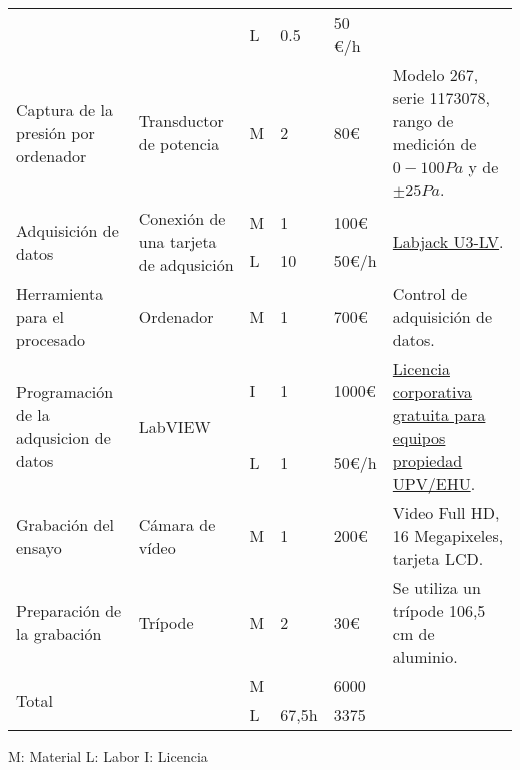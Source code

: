 \begin{landscape}
\begin{longtable}[]{p{4cm}p{4cm}lllp{8cm}}
 & & L & 0.5 & 50 \euro{}/h & \tabularnewline
Captura de la presión por ordenador & Transductor de potencia & M & 2 & 80\euro{} & Modelo 267, serie 1173078, rango de medición de \(0-100 Pa\) y de \(\pm 25 Pa\).\tabularnewline
\multirow{2}{4cm}{Adquisición de datos} & \multirow{2}{4cm}{Conexión de una tarjeta de adqusición} & M & 1 & 100\euro{} & \multirow{2}{8cm}{\href{https://labjack.com/products/u3}{Labjack U3-LV}.}\tabularnewline
 & & L & 10 & 50\euro{}/h & \tabularnewline
Herramienta para el procesado & Ordenador & M & 1 & 700\euro{} & Control de adquisición de datos.\tabularnewline
\multirow{2}{4cm}{Programación de la adqusicion de datos} & \multirow{2}{*}{LabVIEW} & I & 1 & 1000\euro{} & \multirow{2}{8cm}{\href{https://www.ehu.eus/documents/1870470/3788660/software-relacion-es.pdf/a8683d42-8d3f-168a-8029-d1d18a14c8c2}{Licencia corporativa gratuita para equipos propiedad UPV/EHU}.}\tabularnewline
 & & L & 1 & 50\euro{}/h & \tabularnewline

Grabación del ensayo & Cámara de vídeo & M & 1 & 200\euro{} & Video Full HD, 16 Megapixeles, tarjeta LCD.\tabularnewline
Preparación de la grabación & Trípode & M & 2 & 30\euro{} & Se utiliza un trípode 106,5 cm de aluminio.\tabularnewline
\hline
\multirow{2}{8cm}{Total} & & M& & 6000& \tabularnewline
 & & L& 67,5h& 3375& \tabularnewline
\hline
\end{longtable}
M: Material L: Labor I: Licencia
\end{landscape}


